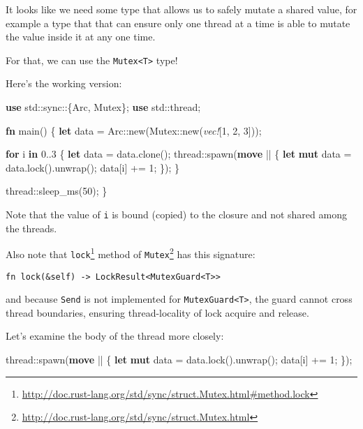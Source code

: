 \documentclass[a4paper,]{book}
\newenvironment{Shaded}{\begin{snugshade}}{\end{snugshade}}
\newcommand{\KeywordTok}[1]{\textcolor[rgb]{0.13,0.29,0.53}{\textbf{{#1}}}}
\newcommand{\DecValTok}[1]{\textcolor[rgb]{0.00,0.00,0.81}{{#1}}}
\newcommand{\PreprocessorTok}[1]{\textcolor[rgb]{0.56,0.35,0.01}{\textit{{#1}}}}
\newcommand{\NormalTok}[1]{{#1}}
\renewcommand{\href}[2]{#2\footnote{\url{#1}}}
\begin{document}
It looks like we need some type that allows us to safely mutate a shared
value, for example a type that that can ensure only one thread at a time
is able to mutate the value inside it at any one time.

For that, we can use the \texttt{Mutex\textless{}T\textgreater{}} type!

Here's the working version:

\begin{Shaded}
\begin{Highlighting}[]
\KeywordTok{use} \NormalTok{std::sync::\{Arc, Mutex\};}
\KeywordTok{use} \NormalTok{std::thread;}

\KeywordTok{fn} \NormalTok{main() \{}
    \KeywordTok{let} \NormalTok{data = Arc::new(Mutex::new(}\PreprocessorTok{vec!}\NormalTok{[}\DecValTok{1}\NormalTok{, }\DecValTok{2}\NormalTok{, }\DecValTok{3}\NormalTok{]));}

    \KeywordTok{for} \NormalTok{i }\KeywordTok{in} \DecValTok{0.}\NormalTok{.}\DecValTok{3} \NormalTok{\{}
        \KeywordTok{let} \NormalTok{data = data.clone();}
        \NormalTok{thread::spawn(}\KeywordTok{move} \NormalTok{|| \{}
            \KeywordTok{let} \KeywordTok{mut} \NormalTok{data = data.lock().unwrap();}
            \NormalTok{data[i] += }\DecValTok{1}\NormalTok{;}
        \NormalTok{\});}
    \NormalTok{\}}

    \NormalTok{thread::sleep_ms(}\DecValTok{50}\NormalTok{);}
\NormalTok{\}}
\end{Highlighting}
\end{Shaded}

Note that the value of \texttt{i} is bound (copied) to the closure and
not shared among the threads.

Also note that
\href{http://doc.rust-lang.org/std/sync/struct.Mutex.html\#method.lock}{\texttt{lock}}
method of
\href{http://doc.rust-lang.org/std/sync/struct.Mutex.html}{\texttt{Mutex}}
has this signature:

\begin{verbatim}
fn lock(&self) -> LockResult<MutexGuard<T>>
\end{verbatim}

and because \texttt{Send} is not implemented for
\texttt{MutexGuard\textless{}T\textgreater{}}, the guard cannot cross
thread boundaries, ensuring thread-locality of lock acquire and release.

Let's examine the body of the thread more closely:

\begin{Shaded}
\begin{Highlighting}[]
\NormalTok{thread::spawn(}\KeywordTok{move} \NormalTok{|| \{}
    \KeywordTok{let} \KeywordTok{mut} \NormalTok{data = data.lock().unwrap();}
    \NormalTok{data[i] += }\DecValTok{1}\NormalTok{;}
\NormalTok{\});}
\end{Highlighting}
\end{Shaded}
\end{document}
